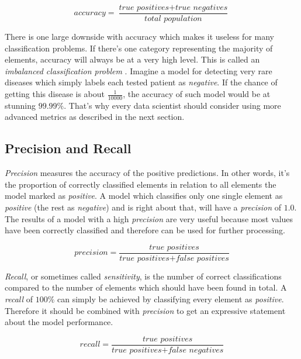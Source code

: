 \begin{equation}
    \label{math:accuracy}
    accuracy = \frac{\textit{true positives} + \textit{true negatives}}{\textit{total population}}
\end{equation}

There is one large downside with accuracy which makes it useless for many classification problems. If there's one category
representing the majority of elements, accuracy will always be at a very high level. This is called an \emph{imbalanced
classification problem} \cite{koehrsen}. Imagine a model for detecting very rare diseases which simply labels each tested patient
as \emph{negative}. If the chance of getting this disease is about \(\frac{1}{10000}\), the accuracy of such model would be at
stunning $99.99\%$. That's why every data scientist should consider using more advanced metrics as described in the next section.

\subsection{Precision and Recall}

\emph{Precision} measures the accuracy of the positive predictions. In other words, it's the proportion of correctly classified
elements in relation to all elements the model marked as \emph{positive}. A model which classifies only one single element as
\emph{positive} (the rest as \emph{negative}) and is right about that, will have a \emph{precision} of $1.0$. The results of a
model with a high \emph{precision} are very useful because most values have been correctly classified and therefore can be used
for further processing.

\begin{equation}
    \label{math:precision}
    precision = \frac{\textit{true positives}}{\textit{true positives} + \textit{false positives}}
\end{equation}

\emph{Recall}, or sometimes called \emph{sensitivity}, is the number of correct classifications compared to the number of elements
which should have been found in total. A \emph{recall} of $100\%$ can simply be achieved by classifying every element as \emph{positive}.
Therefore it should be combined with \emph{precision} to get an expressive statement about the model performance.

\begin{equation}
    \label{math:recall}
    recall = \frac{\textit{true positives}}{\textit{true positives} + \textit{false negatives}}
\end{equation}

